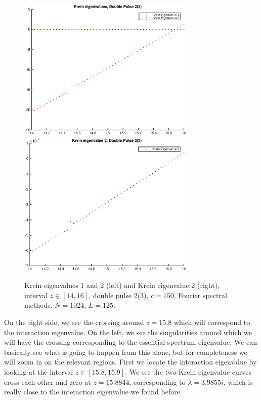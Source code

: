 \documentclass[12pt]{article}
\begin{document}
\begin{figure}[H]
	\includegraphics[width=8.5cm]{1500F_dp2_125_krein1.eps}
	\includegraphics[width=8.5cm]{1500F_dp2_125_krein2.eps}
	\caption{Krein eigenvalues 1 and 2 (left) and Krein eigenvalue 2 (right), interval $z \in [14, 16]$, double pulse 2(3), $c = 150$, Fourier spectral methods, $N = 1024$, $L = 125$. }
\end{figure}

On the right side, we see the crossing around $z = 15.8$ which will correspond to the interaction eigenvalue. On the left, we see the singularities around which we will have the crossing corresponding to the essential spectrum eigenvalue. We can basically see what is going to happen from this alone, but for completeness we will zoom in on the relevant regions. First we locate the interaction eigenvalue by looking at the interval $z \in [15.8, 15.9]$. We see the two Krein eigenvalue curves cross each other and zero at $z = 15.8844$, corresponding to $\lambda = 3.9855i$, which is really close to the interaction eigenvalue we found before.
\end{document}
